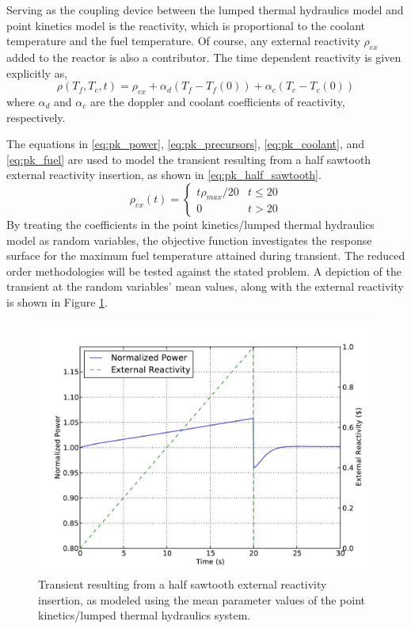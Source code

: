 Serving as the coupling device between the lumped thermal hydraulics model and point kinetics model is the reactivity, which is proportional to the coolant temperature and the fuel temperature. Of course, any external reactivity $\rho_{ex}$ added to the reactor is also a contributor. The time dependent reactivity is given explicitly as,
\begin{equation}
\label{eq:pk_reactivity}
   \rho(T_f,T_c,t) = \rho_{ex} + \alpha_d(T_f - T_f(0))
    + \alpha_c(T_c - T_c(0))
\end{equation}
where $\alpha_d$ and $\alpha_c$ are the doppler and coolant coefficients of reactivity, respectively.  

The equations in \ref{eq:pk_power}, \ref{eq:pk_precursors}, \ref{eq:pk_coolant}, and \ref{eq:pk_fuel} are used to model the transient resulting from a half sawtooth external reactivity insertion, as shown in \ref{eq:pk_half_sawtooth}. 
\begin{equation}
\label{eq:pk_half_sawtooth}
   \rho_{ex}(t) = \left\{
    \begin{array}{cr}
     t\rho_{max}/20 & t \leq 20 \\
     0                      & t > 20 
    \end{array}
    \right.
\end{equation}
By treating the coefficients in the point kinetics/lumped thermal hydraulics model as random variables, the objective function investigates the response surface for the maximum fuel temperature attained during transient. The reduced order methodologies will be tested against the stated problem. A depiction of the transient at the random variables' mean values, along with the external reactivity is shown in Figure \ref{fig:pk_transient}.  
\begin{figure}
\caption[Half sawtooth external reactivity insertion transient behavior.]{ \label{fig:pk_transient}
Transient resulting from a half sawtooth external reactivity insertion, as modeled using the mean parameter values of the point kinetics/lumped thermal hydraulics system.}
 \begin{center}
  \includegraphics[scale=.75]{./Chapter3/pk_power.pdf}
 \end{center}
\end{figure}
